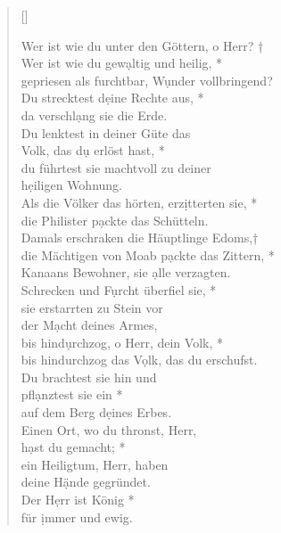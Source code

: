 \begin{verse}[\versewidth]

Wer ist wie du unter den Göttern, o Herr? †\\
Wer ist wie du gew\d altig und heilig, *\\ gepriesen als furchtbar, W\d under vollbringend?\\
\vin Du strecktest d\d eine Rechte aus, *\\
\vin da verschl\d ang sie die Erde.\\
Du lenktest in deiner Güte das\\  Volk, das d\d u erlöst hast, *\\
du führtest sie machtvoll zu deiner \\h\d eiligen Wohnung.\\
\vin Als die Völker das hörten, erz\d itterten sie, *\\
\vin die Philister p\d ackte das Schütteln.\\
Damals erschraken die Häuptlinge Edoms,†\\
die Mächtigen von Moab p\d ackte das Zittern, *\\ Kanaans Bewohner, sie \d alle verzagten.\\
\vin Schrecken und F\d urcht überfiel sie, *\\
\vin sie erstarrten zu Stein vor\\ \vin der M\d acht deines Armes, \\
bis hind\d urchzog, o Herr, dein Volk, *\\ bis hindurchzog das V\d olk, das du erschufst.\\
\vin Du brachtest sie hin und \\ \vin pfl\d anztest sie ein *\\ \vin auf dem Berg d\d eines Erbes.\\
 Einen Ort, wo du thronst, Herr,\\ h\d ast du gemacht; *\\ ein Heiligtum, Herr, haben\\ deine H\d ände gegründet.\\
\vin Der H\d err ist König *\\ \vin für \d immer und ewig. \\

\end{verse}

\vspace{0.3cm}


\def\greinitialformat#1{{\fontsize{40}{40}\selectfont #1}}
\gresetfirstlineaboveinitial{\small \textcolor{red}{Deut 32}}{}
\setaboveinitialseparation{0.72mm}

